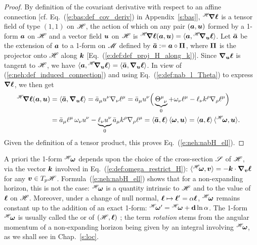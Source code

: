 \begin{proof}
By definition of the covariant derivative with respect to an
affine connection [cf. Eq.~(\ref{e:bas:def_cov_deriv}) in Appendix~\ref{s:bas}],
${}^{\mathscr{H}}\!\bm{\nabla} \bm{\ell}$ is a tensor field of type $(1,1)$ on $\mathscr{H}$,
the action of which on any pair
$(\bm{a}, \bm{u})$ formed by a 1-form $\bm{a}$ on $\mathscr{H}$ and a vector field $\bm{u}$
on $\mathscr{H}$ is
${}^{\mathscr{H}}\!\bm{\nabla} \bm{\ell} (\bm{a}, \bm{u}) = \langle \bm{a}, {}^{\mathscr{H}}\!\bm{\nabla}_{\bm{u}} \bm{\ell} \rangle$.
Let $\bm{\bar{a}}$ be the extension of $\bm{a}$ to a 1-form on $\mathscr{M}$ defined by
$\bm{\bar{a}} := \bm{a} \circ \bm{\Pi}$, where $\bm{\Pi}$ is the projector onto $\mathscr{H}$
along $\bm{k}$ [Eq.~(\ref{e:def:def_proj_H_along_k})]. Since $\bm{\nabla}_{\bm{u}} \bm{\ell}$
is tangent to $\mathscr{H}$, we have
$\langle \bm{a}, {}^{\mathscr{H}}\!\bm{\nabla}_{\bm{u}} \bm{\ell} \rangle = \langle \bm{\bar{a}}, \bm{\nabla}_{\bm{u}} \bm{\ell} \rangle$.
In view of (\ref{e:neh:def_induced_connection}) and using Eq.~(\ref{e:def:nab_l_Theta})
to express $\bm{\nabla}\bm{\ell}$, we then get
\begin{align}
    {}^{\mathscr{H}}\!\bm{\nabla} \bm{\ell} (\bm{a}, \bm{u}) & = \langle \bm{\bar{a}}, \bm{\nabla}_{\bm{u}} \bm{\ell} \rangle
       = \bar{a}_\mu u^\nu \nabla_\nu \ell^\mu
       = \bar{a}_\mu u^\nu \Big( \underbrace{\Theta^\mu_{\ \, \nu}}_{0} + \omega_\nu \ell^\mu
            - \ell_\nu k^\rho \nabla_\rho \ell^\mu \Big)
        \nonumber \\
        & = \bar{a}_\mu \ell^\mu \, \omega_\nu u^\nu - \underbrace{\ell_\nu u^\nu}_{0}
            \bar{a}_\mu k^\rho \nabla_\rho \ell^\mu
             = \langle \bm{\bar{a}}, \bm{\ell} \rangle \, \langle \bm{\omega}, \bm{u} \rangle
             = \langle \bm{a}, \bm{\ell} \rangle \, \langle {}^{\mathscr{H}}\!\bm{\omega}, \bm{u} \rangle . \nonumber
\end{align}
Given the definition of a tensor product,
this proves Eq.~(\ref{e:neh:nabH_ell}).
\end{proof}
A priori the 1-form ${}^{\mathscr{H}}\!\bm{\omega}$ depends upon the choice of the cross-section $\mathscr{S}$
of $\mathscr{H}$, via the vector $\bm{k}$ involved in Eq.~(\ref{e:def:omega_restrict_H}):
$\langle {}^{\mathscr{H}}\!\bm{\omega}, \bm{v} \rangle = - \bm{k} \cdot\bm{\nabla}_{\bm{v}} \bm{\ell}$
for any $\bm{v}\in T_p\mathscr{H}$. Formula~(\ref{e:neh:nabH_ell}) shows that for a non-expanding
horizon, this is not the case: ${}^{\mathscr{H}}\!\bm{\omega}$ is  a quantity intrinsic to $\mathscr{H}$ and to the value of $\bm{\ell}$ on $\mathscr{H}$.
Moreover, under a change of null normal, $\bm{\ell} \mapsto \bm{\ell}' = \alpha \bm{\ell}$,
${}^{\mathscr{H}}\!\bm{\omega}$ remains constant up to the addition of an exact 1-form:
${}^{\mathscr{H}}\!\bm{\omega}' = {}^{\mathscr{H}}\!\bm{\omega} + \mathbf{d}\ln\alpha$.
The 1-form ${}^{\mathscr{H}}\!\bm{\omega}$
is usually called the 
or 
of $(\mathscr{H}, \bm{\ell})$ \cite{AshteBL02,GourgJ06}; the term \emph{rotation}
stems from the angular momentum of a non-expanding horizon
being given by an integral involving ${}^{\mathscr{H}}\!\bm{\omega}$, as we shall see
in Chap.~\ref{s:loc}.

